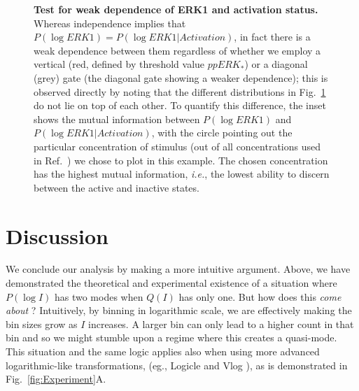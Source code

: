\documentclass[11pt,a4paper,draft]{article}
\begin{document}
\begin{figure}[!htb]
 \centering
  \caption{{\bf Test for weak dependence of ERK1 and activation status.} Whereas independence implies that $P(\log ERK1) = P(\log ERK1 \vert Activation)$, in fact there is a weak dependence between them regardless of whether we employ a vertical (red, defined by threshold value $ppERK_*$) or a diagonal (grey) gate (the diagonal gate showing a weaker dependence); this is observed directly by noting that the different distributions in Fig.~\ref{S1_Fig} do not lie on top of each other. To quantify this difference, the inset shows the mutual information between $P(\log ERK1)$ and $P(\log ERK1 | Activation)$, with the circle pointing out the particular concentration of stimulus (out of all concentrations used in Ref.~\cite{Feinerman2008}) we chose to plot in this example. The chosen concentration has the highest mutual information, {\it i.e.}, the lowest ability to discern between the active and inactive states.}
  \label{S1_Fig}
\end{figure}

\smallskip

\newpage
\section*{Discussion}
We conclude our analysis by making a more intuitive argument. Above, we have demonstrated the theoretical and experimental existence of a situation where $P(\log I)$ has two modes when $Q(I)$ has only one. But how does this \emph{come about} ? Intuitively, by binning in logarithmic scale, we are effectively making the bin sizes grow as $I$ increases. A larger bin can only lead to a higher count in that bin and so we might stumble upon a regime where this creates a quasi-mode. This situation and the same logic applies also when using more advanced logarithmic-like transformations, (eg., Logicle \cite{Parks2006} and Vlog \cite{Bagwell2016} ), as is demonstrated in Fig.~\ref{fig:Experiment}A. 
 
\end{document}
